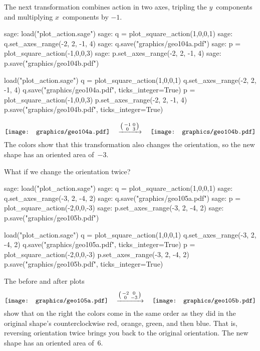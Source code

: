 The next transformation combines action in two axes, 
tripling the $y$~components and multiplying 
$x$~components by $-1$. 
\begin{sagecommandline}
sage: load("plot_action.sage")
sage: q = plot_square_action(1,0,0,1) 
sage: q.set_axes_range(-2, 2, -1, 4) 
sage: q.save("graphics/geo104a.pdf")
sage: p = plot_square_action(-1,0,0,3) 
sage: p.set_axes_range(-2, 2, -1, 4) 
sage: p.save("graphics/geo104b.pdf")
\end{sagecommandline}
\begin{sagesilent}
load("plot_action.sage")
q = plot_square_action(1,0,0,1) 
q.set_axes_range(-2, 2, -1, 4) 
q.save("graphics/geo104a.pdf", ticks_integer=True)
p = plot_square_action(-1,0,0,3) 
p.set_axes_range(-2, 2, -1, 4) 
p.save("graphics/geo104b.pdf", ticks_integer=True)
\end{sagesilent}
\begin{equation*}
  \vcenteredhbox{\texttt{[image: graphics/geo104a.pdf]}}
  \quad\mapsvia{\big (\begin{smallmatrix} -1 &0 \\ 0 &3 \end{smallmatrix}\big )}\quad
  \vcenteredhbox{\texttt{[image: graphics/geo104b.pdf]}}
\end{equation*}
The colors show that this transformation also changes
the orientation, so the new shape has an oriented area of~$-3$.

What if we change the orientation twice?
\begin{sagecommandline}
sage: load("plot_action.sage")
sage: q = plot_square_action(1,0,0,1) 
sage: q.set_axes_range(-3, 2, -4, 2) 
sage: q.save("graphics/geo105a.pdf")
sage: p = plot_square_action(-2,0,0,-3) 
sage: p.set_axes_range(-3, 2, -4, 2) 
sage: p.save("graphics/geo105b.pdf")
\end{sagecommandline}
\begin{sagesilent}
load("plot_action.sage")
q = plot_square_action(1,0,0,1) 
q.set_axes_range(-3, 2, -4, 2) 
q.save("graphics/geo105a.pdf", ticks_integer=True)
p = plot_square_action(-2,0,0,-3) 
p.set_axes_range(-3, 2, -4, 2) 
p.save("graphics/geo105b.pdf", ticks_integer=True)
\end{sagesilent}
The before and after plots
\begin{equation*}
  \vcenteredhbox{\texttt{[image: graphics/geo105a.pdf]}}
  \quad\mapsvia{\big (\begin{smallmatrix} -2 &0 \\ 0 &-3 \end{smallmatrix}\big )}\quad
  \vcenteredhbox{\texttt{[image: graphics/geo105b.pdf]}}
\end{equation*}
show that on the right 
the colors come in the same order as they did in the
original shape's counterclockwise
red, orange, green, and then blue.
That is, reversing orientation twice brings you back to the original 
orientation.
The new shape has an oriented area of~$6$.

